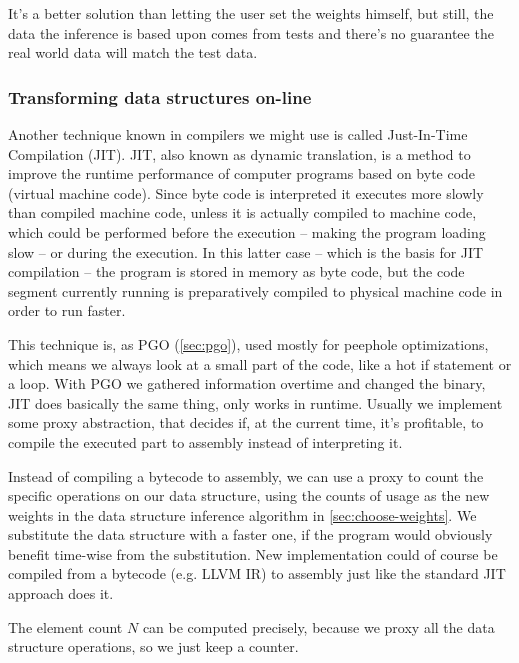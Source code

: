 \documentclass[a4paper,11pt]{article}
\begin{document}
			It's a better solution than letting the user set the weights himself, but still, the data the
			inference is based upon comes from tests and there's no guarantee the real world data will
			match the test data.

		\subsubsection{Transforming data structures on-line} \label{sec:transforming-on-line}

            Another technique known in compilers we might use is called Just-In-Time Compilation (JIT). JIT, also known
            as dynamic translation, is a method to improve the runtime performance of computer programs based on byte
            code (virtual machine code). Since byte code is interpreted it executes more slowly than compiled machine
            code, unless it is actually compiled to machine code, which could be performed before the execution – making
            the program loading slow – or during the execution. In this latter case – which is the basis for JIT
            compilation – the program is stored in memory as byte code, but the code segment currently running is
            preparatively compiled to physical machine code in order to run faster.\cite{Wijit}

            This technique is, as PGO (\autoref{sec:pgo}), used mostly for peephole optimizations, which means we always
            look at a small part of the code, like a hot if statement or a loop. With PGO we gathered information
            overtime and changed the binary, JIT does basically the same thing, only works in runtime. Usually we
            implement some proxy abstraction, that decides if, at the current time, it's profitable, to compile the
            executed part to assembly instead of interpreting it.

            Instead of compiling a bytecode to assembly, we can use a proxy to count the specific operations on our
            data structure, using the counts of usage as the new weights in the data structure inference algorithm in
            \autoref{sec:choose-weights}. We substitute the data structure with a faster one, if the program would
            obviously benefit time-wise from the substitution. New implementation could of course be compiled from a
            bytecode (e.g. LLVM IR) to assembly just like the standard JIT approach does it.

            The element count $N$ can be computed precisely, because we proxy all the data structure operations, so we
            just keep a counter.
\end{document}
